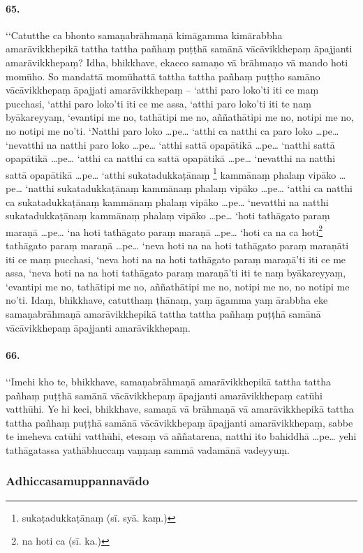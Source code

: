 \paragraph{65.}
‘‘Catutthe ca bhonto samaṇabrāhmaṇā kimāgamma kimārabbha amarāvikkhepikā tattha tattha pañhaṃ puṭṭhā samānā vācāvikkhepaṃ āpajjanti amarāvikkhepaṃ? Idha, bhikkhave, ekacco samaṇo vā brāhmaṇo vā mando hoti momūho. So mandattā momūhattā tattha tattha pañhaṃ puṭṭho samāno vācāvikkhepaṃ āpajjati amarāvikkhepaṃ – ‘atthi paro loko’ti iti ce maṃ pucchasi, ‘atthi paro loko’ti iti ce me assa, ‘atthi paro loko’ti iti te naṃ byākareyyaṃ, ‘evantipi me no, tathātipi me no, aññathātipi me no, notipi me no, no notipi me no’ti. ‘Natthi paro loko …pe… ‘atthi ca natthi ca paro loko …pe… ‘nevatthi na natthi paro loko …pe… ‘atthi sattā opapātikā …pe… ‘natthi sattā opapātikā …pe… ‘atthi ca natthi ca sattā opapātikā …pe… ‘nevatthi na natthi sattā opapātikā …pe… ‘atthi sukatadukkaṭānaṃ \footnote{sukaṭadukkaṭānaṃ (sī. syā. kaṃ.)} kammānaṃ phalaṃ vipāko …pe… ‘natthi sukatadukkaṭānaṃ kammānaṃ phalaṃ vipāko …pe… ‘atthi ca natthi ca sukatadukkaṭānaṃ kammānaṃ phalaṃ vipāko …pe… ‘nevatthi na natthi sukatadukkaṭānaṃ kammānaṃ phalaṃ vipāko …pe… ‘hoti tathāgato paraṃ maraṇā …pe… ‘na hoti tathāgato paraṃ maraṇā …pe… ‘hoti ca na ca hoti\footnote{na hoti ca (sī. ka.)} tathāgato paraṃ maraṇā …pe… ‘neva hoti na na hoti tathāgato paraṃ maraṇāti iti ce maṃ pucchasi, ‘neva hoti na na hoti tathāgato paraṃ maraṇā’ti iti ce me assa, ‘neva hoti na na hoti tathāgato paraṃ maraṇā’ti iti te naṃ byākareyyaṃ, ‘evantipi me no, tathātipi me no, aññathātipi me no, notipi me no, no notipi me no’ti. Idaṃ, bhikkhave, catutthaṃ ṭhānaṃ, yaṃ āgamma yaṃ ārabbha eke samaṇabrāhmaṇā amarāvikkhepikā tattha tattha pañhaṃ puṭṭhā samānā vācāvikkhepaṃ āpajjanti amarāvikkhepaṃ.

\paragraph{66.}
‘‘Imehi kho te, bhikkhave, samaṇabrāhmaṇā amarāvikkhepikā tattha tattha pañhaṃ puṭṭhā samānā vācāvikkhepaṃ āpajjanti amarāvikkhepaṃ catūhi vatthūhi. Ye hi keci, bhikkhave, samaṇā vā brāhmaṇā vā amarāvikkhepikā tattha tattha pañhaṃ puṭṭhā samānā vācāvikkhepaṃ āpajjanti amarāvikkhepaṃ, sabbe te imeheva catūhi vatthūhi, etesaṃ vā aññatarena, natthi ito bahiddhā …pe… yehi tathāgatassa yathābhuccaṃ vaṇṇaṃ sammā vadamānā vadeyyuṃ.

\subsubsection{Adhiccasamuppannavādo}

